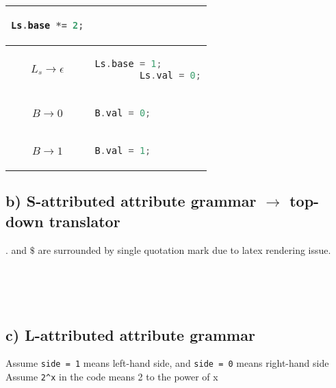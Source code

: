 \documentclass[12pt, A4]{article}
\begin{document}
\begin{tabular}{|c|l|}
\begin{lstlisting}[language=c]
        Ls.base *= 2;
        \end{lstlisting}
        \\ 
        \hline 
        $L_s \rightarrow \epsilon$& 
        \begin{lstlisting}[language=c]
        Ls.base = 1;
        Ls.val = 0;
        \end{lstlisting}
        \\ 
        \hline 
        $B \rightarrow 0$&
        \begin{lstlisting}[language=c]
        B.val = 0;
        \end{lstlisting}
        \\  
        \hline 
        $B \rightarrow 1$&
        \begin{lstlisting}[language=c]
        B.val = 1;
        \end{lstlisting}
        \\ 
        \hline 
    \end{tabular} 
	
    \newpage
	\subsection*{b) S-attributed attribute grammar $\rightarrow$ top-down translator}
    
    $.$ and $\$$ are surrounded by single quotation mark due to latex rendering issue. \\
    
    \inputminted{c++}{QuestionB/S.cpp}
    
    \inputminted{c++}{QuestionB/R.cpp}
    
    \inputminted{c++}{QuestionB/L.cpp}
    
    \inputminted{c++}{QuestionB/Ls.cpp}
    
    \inputminted{c++}{QuestionB/B.cpp}
    
    \newpage
	\subsection*{c) L-attributed attribute grammar}
    
    Assume \texttt{side = 1} means left-hand side, and \texttt{side = 0} means right-hand side\\
    
    \noindent Assume \texttt{2^x} in the code means 2 to the power of x\\
        
\end{document}
